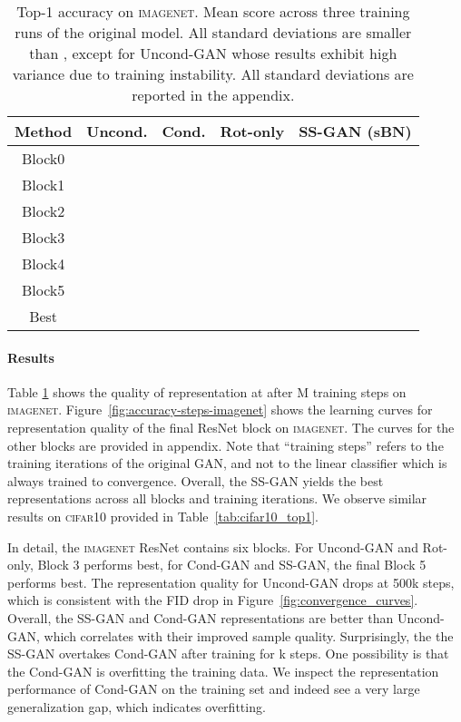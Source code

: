 \documentclass[10pt,twocolumn,letterpaper]{article}
\newcommand{\cifar}{\textsc{cifar10}}
\newcommand{\imagenet}{\textsc{imagenet}}
\begin{document}
\begin{table}[b]
\centering
\small
\caption{\label{tab:imagenet_top1} Top-1 accuracy on \imagenet{}.
Mean score across three training runs of the original model.
All standard deviations are smaller than , except for Uncond-GAN whose results exhibit high variance due to training instability.
All standard deviations are reported in the appendix.
}
\begin{tabular}{ccccc}
\toprule
Method & Uncond.         & Cond.          & Rot-only                    & SS-GAN (sBN)                \\
\midrule
Block0 &            &            &   &           \\
Block1 &            &            &            &  \\
Block2 &            &            &            &   \\
Block3 &            &            &            &   \\
Block4 &            &            &            &   \\
Block5 &            &            &            &   \\
\midrule
Best   &  &  &            &   \\
\bottomrule
\end{tabular}
 \end{table}

\paragraph{Results}
Table \ref{tab:imagenet_top1} shows the quality of representation at after M training steps on \imagenet{}.
Figure~\ref{fig:accuracy-steps-imagenet} shows the learning curves for representation quality of the final ResNet block on \imagenet{}.
The curves for the other blocks are provided in appendix.
Note that ``training steps'' refers to the training iterations of the original GAN, and not to the linear classifier which is always trained to convergence.
Overall, the SS-GAN yields the best representations across all blocks and training iterations.
We observe similar results on \cifar{} provided  in Table~\ref{tab:cifar10_top1}.

In detail, the \imagenet{} ResNet contains six blocks.
For Uncond-GAN and Rot-only, Block 3 performs best, for Cond-GAN and SS-GAN, the final Block 5 performs best.
The representation quality for Uncond-GAN drops at 500k steps,
which is consistent with the FID drop in Figure~\ref{fig:convergence_curves}.
Overall, the SS-GAN and Cond-GAN representations are better than Uncond-GAN, which correlates with their improved sample quality.
Surprisingly, the the SS-GAN overtakes Cond-GAN after training for k steps.
One possibility is that the Cond-GAN is overfitting the training data.
We inspect the representation performance of Cond-GAN on the training set and indeed see a very large generalization gap, which indicates overfitting.
\end{document}
